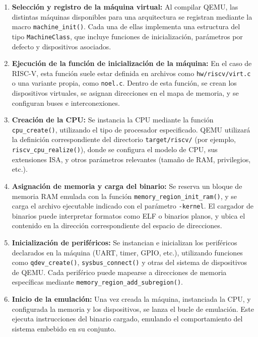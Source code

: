 \begin{enumerate}
  \item \textbf{Selección y registro de la máquina virtual:} Al compilar QEMU, las distintas máquinas disponibles para una arquitectura se registran mediante la macro \texttt{machine\_init()}. Cada una de ellas implementa una estructura del tipo \texttt{MachineClass}, que incluye funciones de inicialización, parámetros por defecto y dispositivos asociados.

  \item \textbf{Ejecución de la función de inicialización de la máquina:} En el caso de RISC-V, esta función suele estar definida en archivos como \texttt{hw/riscv/virt.c} o una variante propia, como \texttt{noel.c}. Dentro de esta función, se crean los dispositivos virtuales, se asignan direcciones en el mapa de memoria, y se configuran buses e interconexiones.

  \item \textbf{Creación de la CPU:} Se instancia la CPU mediante la función \texttt{cpu\_create()}, utilizando el tipo de procesador especificado. QEMU utilizará la definición correspondiente del directorio \texttt{target/riscv/} (por ejemplo, \texttt{riscv\_cpu\_realize()}), donde se configura el modelo de CPU, sus extensiones ISA, y otros parámetros relevantes (tamaño de RAM, privilegios, etc.).

  \item \textbf{Asignación de memoria y carga del binario:} Se reserva un bloque de memoria RAM emulada con la función \texttt{memory\_region\_init\_ram()}, y se carga el archivo ejecutable indicado con el parámetro \texttt{-kernel}. El cargador de binarios puede interpretar formatos como ELF o binarios planos, y ubica el contenido en la dirección correspondiente del espacio de direcciones.

  \item \textbf{Inicialización de periféricos:} Se instancian e inicializan los periféricos declarados en la máquina (UART, timer, GPIO, etc.), utilizando funciones como \texttt{qdev\_create()}, \texttt{sysbus\_connect()} y otras del sistema de dispositivos de QEMU. Cada periférico puede mapearse a direcciones de memoria específicas mediante \texttt{memory\_region\_add\_subregion()}.

  \item \textbf{Inicio de la emulación:} Una vez creada la máquina, instanciada la CPU, y configurada la memoria y los dispositivos, se lanza el bucle de emulación. Este ejecuta instrucciones del binario cargado, emulando el comportamiento del sistema embebido en su conjunto.
\end{enumerate}

